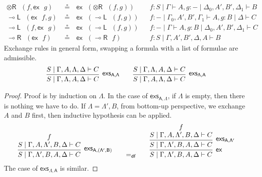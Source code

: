 \documentclass[copyright,creativecommons]{eptcs}
\theoremstyle{definition}
\newcommand{\tr}{\otimes \mathsf{R}}
\newcommand{\lright}{{\multimap}\mathsf{R}}
\newcommand{\lleft}{{\multimap}\mathsf{L}}
\newcommand{\defeq}{=_{\mathsf{df}}}
\newcommand{\ex}{\mathsf{ex}}
\begin{document}
\begin{equation}
\begin{array}{rlll}
    \\
    \tr \text{ } (f , \ex \text{ } g) &\circeq \text{ } \ex \text{ } (\tr \text{ } (f , g)) &&f : S \mid \Gamma \vdash A , g : {-} \mid \Delta_0 , A' , B' , \Delta_1 \vdash B
    \\
    \lleft \text{ } (\ex \text{ } f , g) &\circeq \text{ } \ex \text{ } (\lleft \text{ } (f , g)) &&f : {-} \mid \Gamma_0 , A' , B' , \Gamma_1 \vdash A , g : B \mid \Delta \vdash C
    \\
    \lleft \text{ } (f , \ex \text{ } g) &\circeq \text{ } \ex \text{ } (\lleft \text{ } (f , g)) &&f : {-} \mid \Gamma \vdash A , g : B \mid \Delta_0 , A' , B' , \Delta_1 \vdash C
    \\
    \lright \text{ } (\ex \text{ } f) &\circeq \text{ } \ex \text{ } (\lright \text{ } f) &&f : S \mid \Gamma , A' , B' , \Delta , A \vdash B
  \end{array}
\end{equation}
Exchange rules in general form, swapping a formula with a list of formulae are admissible.
  \begin{displaymath}
    \begin{array}{c}
      \infer[\mathsf{exs_{A , \Lambda}}]{S \mid \Gamma , \Lambda , A , \Delta \vdash C}{S \mid \Gamma , A , \Lambda , \Delta \vdash C}
      \qquad
      \infer[\mathsf{exs_{\Lambda , A}}]{S \mid \Gamma , A, \Lambda , \Delta \vdash C}{S \mid \Gamma , \Lambda , A , \Delta \vdash C}  
    \end{array}
  \end{displaymath}
\begin{proof}
  Proof is by induction on $\Lambda$.
  In the case of $\mathsf{exs_{A , \Lambda}}$, if $\Lambda$ is empty, then there is nothing we have to do.
  If $\Lambda = \Lambda' , B$, from bottom-up perspective, we exchange $A$ and $B$ first, then inductive hypothesis can be applied.
  \begin{displaymath}
    \begin{array}{c}
      \infer[\mathsf{exs_{A , (\Lambda' , B)}}]{S \mid \Gamma , \Lambda' , B , A , \Delta \vdash C}{
        \deduce{S \mid \Gamma , A , \Lambda' , B , \Delta \vdash C}{f}
      }
      \qquad
      {\defeq}
      \qquad
      \infer[\ex]{S \mid \Gamma , \Lambda' , B , A , \Delta \vdash C}{
        \infer[\mathsf{exs_{A , \Lambda'}}]{S \mid \Gamma , \Lambda' , B , A , \Delta \vdash C}{
          \deduce{S \mid \Gamma , A , \Lambda' , B , \Delta \vdash C}{f}
        }
      }
    \end{array}
  \end{displaymath}
The case of $\mathsf{exs_{\Lambda , A}}$ is similar.
\end{proof}
\end{document}
